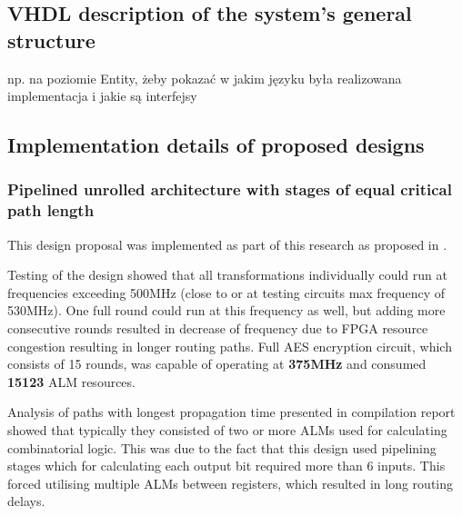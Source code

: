 

\subsection{VHDL description of the system's general structure}
np. na poziomie Entity, żeby pokazać w jakim języku była realizowana implementacja i jakie są interfejsy

\subsection{Implementation details of proposed designs}


\subsubsection{Pipelined unrolled architecture with stages of equal critical path length}

This design proposal was implemented as part of this research as proposed in \cite{vlsi}.

Testing of the design showed that all transformations individually could run at frequencies exceeding 500MHz (close to or at testing circuits max frequency of 530MHz). One full round could run at this frequency as well, but adding more consecutive rounds resulted in decrease of frequency due to FPGA resource congestion resulting in longer routing paths. Full AES encryption circuit, which consists of 15 rounds, was capable of operating at \textbf{375MHz} and consumed \textbf{15123} ALM resources.

Analysis of paths with longest propagation time presented in compilation report showed that typically they consisted of two or more ALMs used for calculating combinatorial logic. This was due to the fact that this design used pipelining stages which for calculating each output bit required more than 6 inputs. This forced utilising multiple ALMs between registers, which resulted in long routing delays.

